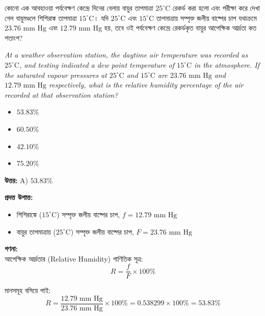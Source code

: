 \documentclass[12pt, a4paper]{article}
\begin{document}
\begin{tcolorbox}[questionbox={প্রশ্ন (Question) 17}]
    \noindent
    কোনো এক আবহাওয়া পর্যবেক্ষণ কেন্দ্রে দিনের বেলায় বায়ুর তাপমাত্রা $25^\circ\text{C}$ রেকর্ড করা হলো এবং পরীক্ষা করে দেখা গেল বায়ুমণ্ডলে শিশিরাঙ্ক তাপমাত্রা $15^\circ\text{C}$। যদি $25^\circ\text{C}$ এবং $15^\circ\text{C}$ তাপমাত্রায় সম্পৃক্ত জলীয় বাষ্পের চাপ যথাক্রমে $23.76\text{ mm Hg}$ এবং $12.79\text{ mm Hg}$ হয়, তবে ওই পর্যবেক্ষণ কেন্দ্রে রেকর্ডকৃত বায়ুর আপেক্ষিক আর্দ্রতা কত শতাংশ?
    
    \vspace{0.8em}
    \begin{english}
    \noindent\textit{\color{darkgray}
    At a weather observation station, the daytime air temperature was recorded as $25^\circ\text{C}$, and testing indicated a dew point temperature of $15^\circ\text{C}$ in the atmosphere. If the saturated vapour pressures at $25^\circ\text{C}$ and $15^\circ\text{C}$ are $23.76\text{ mm Hg}$ and $12.79\text{ mm Hg}$ respectively, what is the relative humidity percentage of the air recorded at that observation station?
    }
    \end{english}
\end{tcolorbox}

\begin{itemize}[label={}, leftmargin=1cm, itemsep=0.5em]
    \item[\textbf{A)}] $53.83\%$
    \item[\textbf{B)}] $60.50\%$
    \item[\textbf{C)}] $42.10\%$
    \item[\textbf{D)}] $75.20\%$
\end{itemize}

\vspace{0.5em}
\begin{tcolorbox}[answerbox]
    \textbf{\color{success} উত্তর:} A) $53.83\%$
\end{tcolorbox}
\vspace{1em}

\begin{tcolorbox}[solutionbox={সমাধান (Solution)}]
    \noindent
    \textbf{প্রদত্ত উপাত্ত:}
    \begin{itemize}[leftmargin=1.5em, itemsep=0.2em]
        \item শিশিরাঙ্কে ($15^\circ\text{C}$) সম্পৃক্ত জলীয় বাষ্পের চাপ, $f = 12.79\text{ mm Hg}$
        \item বায়ুর তাপমাত্রায় ($25^\circ\text{C}$) সম্পৃক্ত জলীয় বাষ্পের চাপ, $F = 23.76\text{ mm Hg}$
    \end{itemize}

    \vspace{0.6em}
    \noindent\textbf{গণনা:} \\
    আপেক্ষিক আর্দ্রতার (Relative Humidity) গাণিতিক সূত্র:
    \[ R = \frac{f}{F} \times 100\% \]
    
    মানসমূহ বসিয়ে পাই:
    \[ R = \frac{12.79\text{ mm Hg}}{23.76\text{ mm Hg}} \times 100\% = 0.538299 \times 100\% = \mathbf{53.83\%} \]
\end{tcolorbox}
\end{document}
